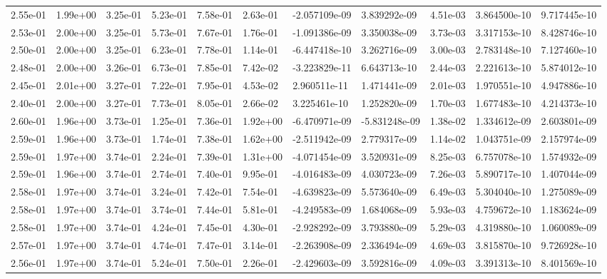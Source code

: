 \begin{longtable}{| p{} | p{} |}
2.55e-01 & 1.99e+00 & 3.25e-01 & 5.23e-01 & 7.58e-01 & 2.63e-01 & -2.057109e-09 &  3.839292e-09 &  4.51e-03 &  3.864500e-10 &  9.717445e-10 \\
2.53e-01 & 2.00e+00 & 3.25e-01 & 5.73e-01 & 7.67e-01 & 1.76e-01 & -1.091386e-09 &  3.350038e-09 &  3.73e-03 &  3.317153e-10 &  8.428746e-10 \\
2.50e-01 & 2.00e+00 & 3.25e-01 & 6.23e-01 & 7.78e-01 & 1.14e-01 & -6.447418e-10 &  3.262716e-09 &  3.00e-03 &  2.783148e-10 &  7.127460e-10 \\
2.48e-01 & 2.00e+00 & 3.26e-01 & 6.73e-01 & 7.85e-01 & 7.42e-02 & -3.223829e-11 &  6.643713e-10 &  2.44e-03 &  2.221613e-10 &  5.874012e-10 \\
2.45e-01 & 2.01e+00 & 3.27e-01 & 7.22e-01 & 7.95e-01 & 4.53e-02 &  2.960511e-11 &  1.471441e-09 &  2.01e-03 &  1.970551e-10 &  4.947886e-10 \\
2.40e-01 & 2.00e+00 & 3.27e-01 & 7.73e-01 & 8.05e-01 & 2.66e-02 &  3.225461e-10 &  1.252820e-09 &  1.70e-03 &  1.677483e-10 &  4.214373e-10 \\
2.60e-01 & 1.96e+00 & 3.73e-01 & 1.25e-01 & 7.36e-01 & 1.92e+00 & -6.470971e-09 & -5.831248e-09 &  1.38e-02 &  1.334612e-09 &  2.603801e-09 \\
2.59e-01 & 1.96e+00 & 3.73e-01 & 1.74e-01 & 7.38e-01 & 1.62e+00 & -2.511942e-09 &  2.779317e-09 &  1.14e-02 &  1.043751e-09 &  2.157974e-09 \\
2.59e-01 & 1.97e+00 & 3.74e-01 & 2.24e-01 & 7.39e-01 & 1.31e+00 & -4.071454e-09 &  3.520931e-09 &  8.25e-03 &  6.757078e-10 &  1.574932e-09 \\
2.59e-01 & 1.96e+00 & 3.74e-01 & 2.74e-01 & 7.40e-01 & 9.95e-01 & -4.016483e-09 &  4.030723e-09 &  7.26e-03 &  5.890717e-10 &  1.407044e-09 \\
2.58e-01 & 1.97e+00 & 3.74e-01 & 3.24e-01 & 7.42e-01 & 7.54e-01 & -4.639823e-09 &  5.573640e-09 &  6.49e-03 &  5.304040e-10 &  1.275089e-09 \\
2.58e-01 & 1.97e+00 & 3.74e-01 & 3.74e-01 & 7.44e-01 & 5.81e-01 & -4.249583e-09 &  1.684068e-09 &  5.93e-03 &  4.759672e-10 &  1.183624e-09 \\
2.58e-01 & 1.97e+00 & 3.74e-01 & 4.24e-01 & 7.45e-01 & 4.30e-01 & -2.928292e-09 &  3.793880e-09 &  5.29e-03 &  4.319880e-10 &  1.060089e-09 \\
2.57e-01 & 1.97e+00 & 3.74e-01 & 4.74e-01 & 7.47e-01 & 3.14e-01 & -2.263908e-09 &  2.336494e-09 &  4.69e-03 &  3.815870e-10 &  9.726928e-10 \\
2.56e-01 & 1.97e+00 & 3.74e-01 & 5.24e-01 & 7.50e-01 & 2.26e-01 & -2.429603e-09 &  3.592816e-09 &  4.09e-03 &  3.391313e-10 &  8.401569e-10 \\

\end{longtable}
